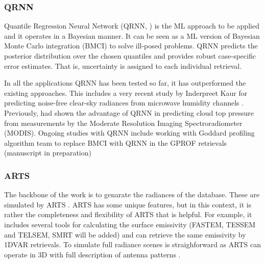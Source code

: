 \documentclass[12pt,oneside,a4paper]{article}
\begin{document}
\subsubsection{QRNN}
%
\label{sec:qrnn}

Quantile Regression Neural Network (QRNN, \citet{pfreundschuh:aneur:18}) is the
ML approach to be applied and it operates in a Bayesian manner. It can be seen
as a ML version of Bayesian Monte Carlo integration (BMCI) to solve ill-posed
problems. QRNN predicts the posterior distribution over the chosen quantiles
and provides robust case-specific error estimates. That is, uncertainty is
assigned to each individual retrieval.


In all the applications QRNN has been tested so far, it has outperformed the
existing approaches. This includes a very recent study by Inderpreet Kaur for
predicting noise-free clear-sky radiances from microwave humidity channels
\citep{kaur:2021:canma}. Previously, \citet{pfreundschuh:aneur:18} had shown
the advantage of QRNN in predicting cloud top pressure from measurements by the
Moderate Resolution Imaging Spectroradiometer (MODIS). Ongoing studies with
QRNN include working with Goddard profiling algorithm \citep[GPROF,][]
{kummerow:2015:thevo} team to replace BMCI with QRNN in the GPROF retrievals
(manuscript in preparation)


\subsubsection{ARTS}
\label{sec:arts}
% 
The backbone of the work is to genarate the radiances of the database. These
are simulated by ARTS \citep[Atmospheric Radiative Transfer Simulator,][]
{eriksson:arts2:11}. ARTS has some unique features, but in this context,
it is rather the completeness and flexibility of ARTS that is helpful. For
example, it includes several tools for calculating the surface emissivity
(FASTEM, TESSEM and TELSEM, SMRT will be added) and can retrieve the same
emissivity by 1DVAR retrievals. To simulate full radiance scenes is
straighforward as ARTS can operate in 3D with full description of antenna
patterns \citep{duncan:anexp:19}.
\end{document}

